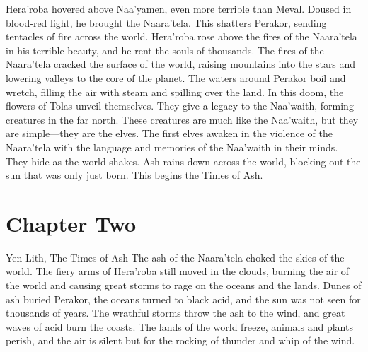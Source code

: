 \documentclass[smalldemyvopaper,11pt,twoside,onecolumn,openright,extrafontsizes]{memoir}
\begin{document}
{{Hera’roba hovered above Naa’yamen, even more terrible than Meval. Doused in blood-red light, he brought the Naara’tela. This shatters Perakor, sending tentacles of fire across the world. Hera’roba rose above the fires of the Naara’tela in his terrible beauty, and he rent the souls of thousands. The fires of the Naara’tela cracked the surface of the world, raising mountains into the stars and lowering valleys to the core of the planet. The waters around Perakor boil and wretch, filling the air with steam and spilling over the land. In this doom, the flowers of Tolas unveil themselves. They give a legacy to the Naa’waith, forming creatures in the far north. These creatures are much like the Naa’waith, but they are simple—they are the elves. The first elves awaken in the violence of the Naara’tela with the language and memories of the Naa’waith in their minds. They hide as the world shakes. Ash rains down across the world, blocking out the sun that was only just born. This begins the Times of Ash.

\chapter{Chapter Two}

Yen Lith, The Times of Ash
The ash of the Naara’tela choked the skies of the world. The fiery arms of Hera’roba still moved in the clouds, burning the air of the world and causing great storms to rage on the oceans and the lands. Dunes of ash buried Perakor, the oceans turned to black acid, and the sun was not seen for thousands of years. The wrathful storms throw the ash to the wind, and great waves of acid burn the coasts. The lands of the world freeze, animals and plants perish, and the air is silent but for the rocking of thunder and whip of the wind.

}}
\end{document}

